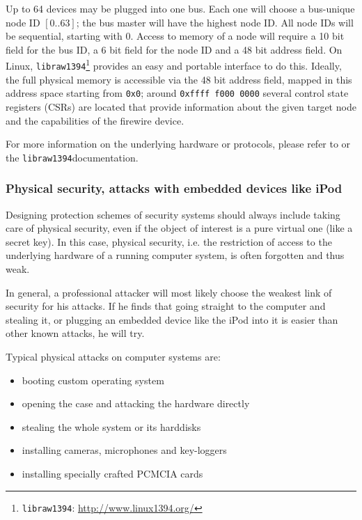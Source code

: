 Up to 64 devices may be plugged into one bus. Each one will choose a bus-unique
node ID $[0..63]$; the bus master will have the highest node ID. All node IDs
will be sequential, starting with 0. Access to memory of a node will require a
10 bit field for the bus ID, a 6 bit field for the node ID and a 48 bit address
field.  On Linux, \texttt{libraw1394}\footnote{\texttt{libraw1394}:
\href{http://www.linux1394.org/}{http://www.linux1394.org/}} provides an easy
and portable interface to do this. Ideally, the full physical memory is
accessible via the 48 bit address field, mapped in this address space starting
from \texttt{0x0}; around \texttt{0xffff~f000~0000} several control state
registers (CSRs) are located that provide information about the given target
node and the capabilities of the firewire device.

For more information on the underlying hardware or protocols, please refer to
\cite{OHCIspecs:2000,fwire_sys_arch:2222} or the
\texttt{libraw1394}\footnotemark[\value{footnote}] documentation.



\subsubsection{Physical security, attacks with embedded devices like iPod}

Designing protection schemes of security systems should always include taking
care of physical security, even if the object of interest is a pure virtual one
(like a secret key). In this case, physical security, i.e. the restriction of
access to the underlying hardware of a running computer system, is often
forgotten and thus weak.

In general, a professional attacker will most likely choose the weakest link of
security for his attacks. If he finds that going straight to the computer and
stealing it, or plugging an embedded device like the iPod into it is easier than
other known attacks, he will try.

Typical physical attacks on computer systems are:

\begin{itemize}

	\item booting custom operating system

	\item opening the case and attacking the hardware directly

	\item stealing the whole system or its harddisks

	\item installing cameras, microphones and key-loggers

	\item installing specially crafted PCMCIA cards

\end{itemize}

